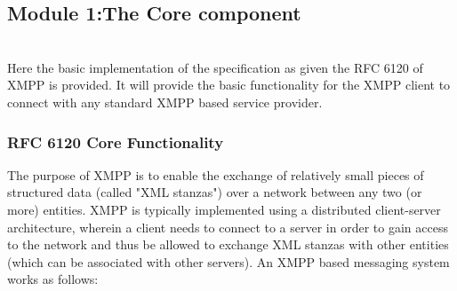 \documentclass{SureshLimkar}
\begin{document}
\subsection{Module 1:The Core component}
\\
\hspace{0.5 in}Here the basic implementation of the specification as given the RFC 6120 of XMPP is provided. It will provide the basic functionality for the XMPP client to connect with any standard XMPP based service provider.
\subsubsection{RFC 6120 Core Functionality}
\hspace{0.5 in}The purpose of XMPP is to enable the exchange of relatively small pieces of structured data (called "XML stanzas") over a network between any two (or more) entities. XMPP is typically implemented using a distributed client-server architecture, wherein a client needs to connect to a server in order to gain access to the network and thus be allowed to exchange XML stanzas with other entities (which can be associated with other servers). An XMPP based messaging system works as follows: 
\\
\end{document}
